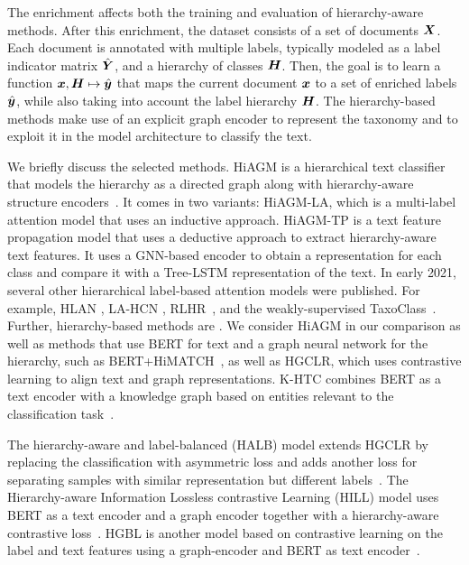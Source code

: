 The enrichment affects both the training and evaluation of hierarchy-aware methods.
After this enrichment, the dataset consists of a set of documents ${\bm{X}}$. Each document is annotated with multiple labels, typically modeled as a label indicator matrix $\hat{{\bm{Y}}}$, and a hierarchy of classes ${\bm{H}}$.
Then, the goal is to learn a function ${\bm{x}}, {\bm{H}} \mapsto \hat{{\bm{y}}}$ that maps the current document ${\bm{x}}$ to a set of enriched labels $\hat{{\bm{y}}}$, while also taking into account the label hierarchy ${\bm{H}}$. 
The hierarchy-based methods make use of an explicit graph encoder to represent the taxonomy and to exploit it in the model architecture to classify the text.

We briefly discuss the selected methods.
HiAGM is a hierarchical text classifier that models the hierarchy as a directed graph along with hierarchy-aware structure encoders~\cite{hiagm}.  
It comes in two variants: HiAGM-LA, which is a multi-label attention model that uses an inductive approach.  
HiAGM-TP is a text feature propagation model that uses a deductive approach to extract hierarchy-aware text features. It uses a GNN-based encoder to obtain a representation for each class and compare it with a Tree-LSTM representation of the text.  
In early 2021, several other hierarchical label-based attention models were published.  For example, HLAN \cite{dong2021explainable}, LA-HCN \cite{DBLP:journals/corr/abs-2009-10938}, RLHR~\cite{liu2021improving}, and the
weakly-supervised Taxo\-Class~\cite{shen-etal-2021-taxoclass}.
Further, hierarchy-based methods are
\cite{DBLP:journals/corr/abs-1812-11270,DBLP:journals/corr/abs-1902-09347,DBLP:journals/corr/abs-1909-00161}.
We consider HiAGM in our comparison as well as methods that use BERT for text and a graph neural
network for the hierarchy, such as BERT+HiMATCH~\cite{DBLP:conf/acl/ChenMLY20}, as well as HGCLR, which uses contrastive learning to align text and graph representations.
K-HTC combines BERT as a text encoder with a knowledge graph based on entities relevant to the classification task~\cite{DBLP:conf/acl/LiuZHWZ0C23-k-htc}. 

The hierarchy-aware and label-balanced (HALB) model extends HGCLR by replacing the classification with asymmetric loss and adds another loss for separating samples with similar representation but different labels~\cite{DBLP:journals/kbs/ZhangLSXTH24-halb}.
The Hierarchy-aware Information Lossless contrastive Learning (HILL) model uses BERT as a text encoder and a graph encoder together with a hierarchy-aware contrastive loss~\cite{hill2024}.
HGBL is another model based on contrastive learning on the label and text features using a graph-encoder and BERT as text encoder~\cite{DBLP:journals/npl/ZhangDLZ25-hgbl}.

